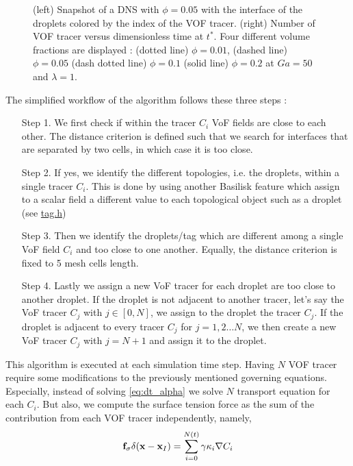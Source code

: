 \begin{figure}[h!]
\begin{tikzpicture}
    \end{tikzpicture}
    \caption{
    (left) Snapshot of a DNS with $\phi = 0.05$ with the interface of the droplets colored by the index of the VOF tracer.
    (right) Number of VOF tracer versus dimensionless time  at $t^*$.
    Four different volume fractions are displayed : (dotted line) $\phi = 0.01$, (dashed line) $\phi = 0.05$ (dash dotted line) $\phi = 0.1$ (solid line) $\phi = 0.2$ at $Ga = 50$ and $\lambda = 1$. 
    }
    \label{fig:diagram}
\end{figure}
The simplified workflow of the algorithm follows these three steps : 
\begin{enumerate}
    \item[Step 1.] We first check if within the tracer $C_i$ VoF fields are close to each other. 
    The distance criterion is defined such that we search for interfaces that are separated by two cells, in which case it is too close. 
    \item[Step 2.] If yes, we identify the different topologies, i.e. the droplets, within a single tracer $C_i$. 
    This is done by using another Basilisk feature which assign to a scalar field a different value to each topological object such as a droplet (see \href{http://basilisk.fr/src/tag.h}{tag.h}) 
    \item[Step 3.] Then we identify the droplets/tag which are different among a single VoF field $C_i$ and too close to one another.
    Equally, the distance criterion is fixed to 5 mesh cells length.  
    \item[Step 4.] Lastly we assign a new VoF tracer for each droplet are too close to another droplet. 
    If the droplet is not adjacent to another tracer, let's say the VoF tracer $C_j$ with $j \in [0,N]$, we assign to the droplet the tracer $C_j$. 
    If the droplet is adjacent to every tracer $C_j$ for $j = 1,2\ldots N$, we then create a new VoF tracer $C_j$  with $j = N+1$ and assign it to the droplet. 
\end{enumerate}
This algorithm is executed at each simulation time step. 
Having $N$ VOF tracer require some modifications to the previously mentioned governing equations. 
Especially, instead of solving \ref{eq:dt_alpha}  we solve $N$ transport equation for each $C_i$.
But also, we compute the surface tension force as the sum of the contribution from each VOF tracer independently, namely,
\begin{equation}
    \textbf{f}_\sigma \delta(\textbf{x}-\textbf{x}_I)
    = \sum_{i=0}^{N(t)} \gamma \kappa_i \grad C_i
\end{equation} 
